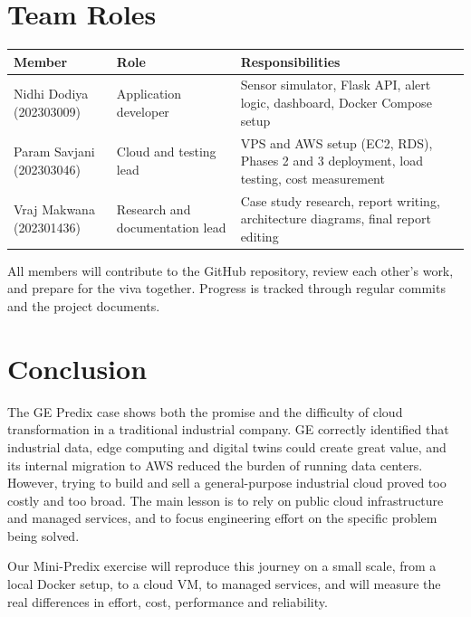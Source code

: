 \documentclass[12pt,a4paper]{article}
\begin{document}
\section{Team Roles}
\begin{center}
\begin{tabularx}{\linewidth}{@{}>{\raggedright\arraybackslash}p{3.2cm}>{\raggedright\arraybackslash}p{3.6cm}L@{}}
\toprule
\textbf{Member} & \textbf{Role} & \textbf{Responsibilities} \\
\midrule
Nidhi Dodiya (202303009) & Application developer & Sensor simulator, Flask API, alert logic, dashboard, Docker Compose setup \\
Param Savjani (202303046) & Cloud and testing lead & VPS and AWS setup (EC2, RDS), Phases 2 and 3 deployment, load testing, cost measurement \\
Vraj Makwana (202301436) & Research and documentation lead & Case study research, report writing, architecture diagrams, final report editing \\
\bottomrule
\end{tabularx}
\end{center}
All members will contribute to the GitHub repository, review each other's work, and prepare for the viva together.
Progress is tracked through regular commits and the project documents.

\section{Conclusion}
The GE Predix case shows both the promise and the difficulty of cloud transformation in a traditional industrial
company. GE correctly identified that industrial data, edge computing and digital twins could create great value,
and its internal migration to AWS reduced the burden of running data centers. However, trying to build and sell a
general-purpose industrial cloud proved too costly and too broad. The main lesson is to rely on public cloud
infrastructure and managed services, and to focus engineering effort on the specific problem being solved.

Our Mini-Predix exercise will reproduce this journey on a small scale, from a local Docker setup, to a cloud VM, to
managed services, and will measure the real differences in effort, cost, performance and reliability.

\end{document}
